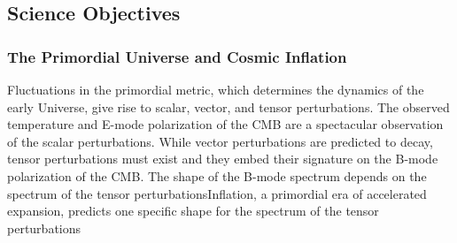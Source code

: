 
\subsection{Science Objectives}
\label{sec:science}

\vspace{-0.05in}

 
\subsubsection{The Primordial Universe and Cosmic Inflation}

\vspace{-0.05in}


Fluctuations in the primordial metric, which determines the dynamics of the early Universe, give rise to scalar, vector, and tensor perturbations. 
The observed temperature and E-mode polarization of the \ac{CMB} are a spectacular observation of the scalar perturbations. 
While vector perturbations are predicted to decay, tensor perturbations must exist and they embed their signature on the B-mode 
polarization of the \ac{CMB}. The shape of the B-mode spectrum depends on the spectrum of the tensor perturbationsInflation, a primordial era of accelerated expansion, predicts one specific shape for the spectrum of the 
tensor perturbations

